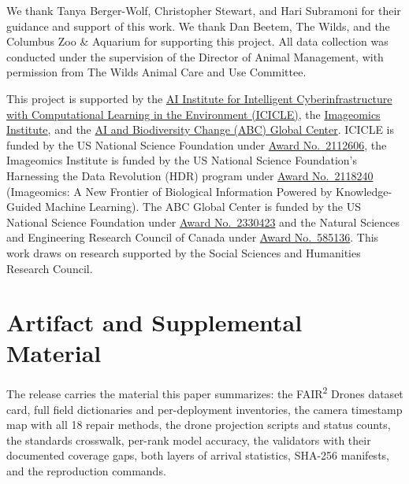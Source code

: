\documentclass[sigconf]{acmart}
\begin{document}
\begin{acks}
We thank Tanya Berger-Wolf, Christopher Stewart, and Hari Subramoni for
their guidance and support of this work. We thank Dan Beetem, The Wilds, and the Columbus Zoo \& Aquarium for
supporting this project. All data collection was conducted under the
supervision of the Director of Animal Management, with permission from
The Wilds Animal Care and Use Committee.

This project is supported by the \href{https://icicle.osu.edu/}{AI
Institute for Intelligent Cyberinfrastructure with Computational
Learning in the Environment (ICICLE)}, the
\href{https://imageomics.org/}{Imageomics Institute}, and the
\href{http://abcresearchcenter.org/}{AI and Biodiversity Change (ABC)
Global Center}. ICICLE is funded by the US National Science Foundation
under
\href{https://www.nsf.gov/awardsearch/showAward?AWD_ID=2112606}{Award
No.\ 2112606}, the Imageomics Institute is funded by the US National
Science Foundation's Harnessing the Data Revolution (HDR) program under
\href{https://www.nsf.gov/awardsearch/showAward?AWD_ID=2118240}{Award
No.\ 2118240} (Imageomics: A New Frontier of Biological Information
Powered by Knowledge-Guided Machine Learning). The ABC Global Center is
funded by the US National Science Foundation under
\href{https://www.nsf.gov/awardsearch/showAward?AWD_ID=2330423&HistoricalAwards=false}{Award
No.\ 2330423} and the Natural Sciences and Engineering Research Council
of Canada under
\href{https://www.nserc-crsng.gc.ca/ase-oro/Details-Detailles_eng.asp?id=782440}{Award
No.\ 585136}. This work draws on research supported by the Social
Sciences and Humanities Research Council.
\end{acks}

\section*{Artifact and Supplemental Material}

The release carries the material this paper summarizes: the
FAIR\textsuperscript{2} Drones dataset card, full field dictionaries and
per-deployment inventories, the camera timestamp map with all 18 repair
methods, the drone projection scripts and status counts, the standards
crosswalk, per-rank model accuracy, the validators with their documented
coverage gaps, both layers of arrival statistics, SHA-256 manifests, and
the reproduction commands.



\end{document}
